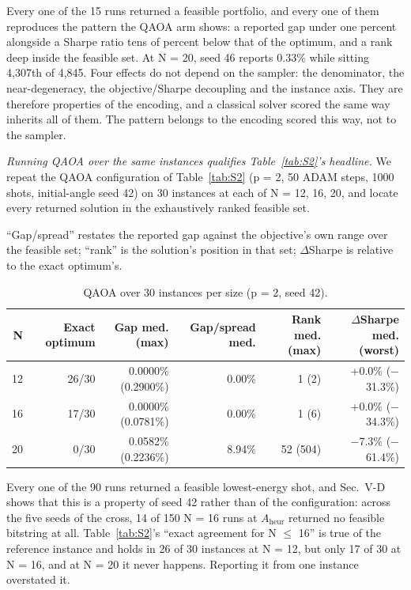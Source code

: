 \documentclass[journal]{IEEEtran}
\begin{document}
Every one of the 15 runs returned a feasible portfolio, and every one of them reproduces the pattern the QAOA arm shows: a reported gap under one percent alongside a Sharpe ratio tens of percent below that of the optimum, and a rank deep inside the feasible set. At N = 20, seed 46 reports 0.33\% while sitting 4,307th of 4,845. Four effects do not depend on the sampler: the denominator, the near-degeneracy, the objective/Sharpe decoupling and the instance axis. They are therefore properties of the encoding, and a classical solver scored the same way inherits all of them. The pattern belongs to the encoding scored this way, not to the sampler.


\textit{Running QAOA over the same instances qualifies Table~\ref{tab:S2}'s headline.} We repeat the QAOA configuration of Table~\ref{tab:S2} (p = 2, 50 ADAM steps, 1000 shots, initial-angle seed 42) on 30 instances at each of N = 12, 16, 20, and locate every returned solution in the exhaustively ranked feasible set.


``Gap/spread'' restates the reported gap against the objective's own range over the feasible set; ``rank'' is the solution's position in that set; $\Delta$Sharpe is relative to the exact optimum's.


\begin{table}[!t]
\centering
\scriptsize
\caption{QAOA over 30 instances per size (p = 2, seed 42).}
\label{tab:S12}
\begin{tabular}{rrrrrr}
\toprule
N & Exact optimum & Gap med. (max) & Gap/spread med. & Rank med. (max) & $\Delta$Sharpe med. (worst) \\
\midrule
12 & 26/30 & 0.0000\% (0.2900\%) & 0.00\% & 1 (2) & +0.0\% ($-$31.3\%) \\
16 & 17/30 & 0.0000\% (0.0781\%) & 0.00\% & 1 (6) & +0.0\% ($-$34.3\%) \\
20 & 0/30 & 0.0582\% (0.2236\%) & 8.94\% & 52 (504) & $-$7.3\% ($-$61.4\%) \\
\bottomrule
\end{tabular}
\end{table}


Every one of the 90 runs returned a feasible lowest-energy shot, and Sec.~V-D shows that this is a property of seed 42 rather than of the configuration: across the five seeds of the cross, 14 of 150 N = 16 runs at $A_{\mathrm{heur}}$ returned no feasible bitstring at all. Table~\ref{tab:S2}'s ``exact agreement for N $\leq$ 16'' is true of the reference instance and holds in 26 of 30 instances at N = 12, but only 17 of 30 at N = 16, and at N = 20 it never happens. Reporting it from one instance overstated it.
\end{document}
